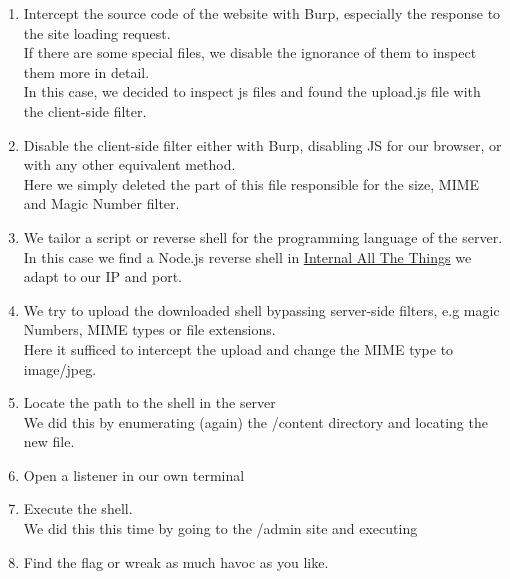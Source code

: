 {\begin{enumerate}
\item Intercept the source code of the website with Burp, especially the response to the site loading request.\\
If there are some special files, we disable the ignorance of them to inspect them more in detail. \\
In this case, we decided to inspect js files and found the upload.js file with the client-side filter.
\item Disable the client-side filter either with Burp, disabling JS for our browser, or with any other equivalent method.\\
Here we simply deleted the part of this file responsible for the size, MIME and Magic Number filter.
\item We tailor a script or reverse shell for the programming language of the server.\\
In this case we find a Node.js reverse shell in \href{https://swisskyrepo.github.io/InternalAllTheThings/cheatsheets/shell-reverse-cheatsheet/}{Internal All The Things} we adapt to our IP and port. 
\item We try to upload the downloaded shell bypassing server-side filters, e.g magic Numbers, MIME types or file extensions. \\
Here it sufficed to intercept the upload and change the MIME type to image/jpeg.
\item Locate the path to the shell in the server\\
We did this by enumerating (again) the /content directory and locating the new file.
\item Open a listener in our own terminal
\item Execute the shell.\\
We did this this time by going to the /admin site and executing 
\item Find the flag or wreak as much havoc as you like.
\end{enumerate}
}